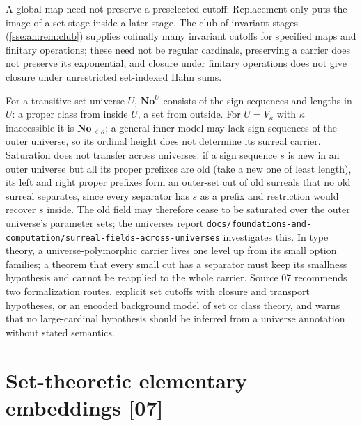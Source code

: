 \documentclass[11pt,a4paper]{article}
\numberwithin{equation}{section}
\theoremstyle{plain}
\theoremstyle{definition}
\theoremstyle{remark}
\newcommand{\No}{\mathbf{No}}
\newcommand{\fn}[1]{\nolinkurl{#1}}%
\newcommand{\src}[1]{\textup{\textsf{\small[#1]}}}%
\begin{document}
A global map need not preserve a preselected cutoff; Replacement only puts
the image of a set stage inside a later stage. The club of invariant stages
(\cref{sse:an:rem:club}) supplies cofinally many invariant cutoffs for
specified maps and finitary operations; these need not be regular cardinals,
preserving a carrier does not preserve its exponential, and closure under
finitary operations does not give closure under unrestricted set-indexed
Hahn sums.

For a transitive set universe $U$, $\No^U$ consists of the sign sequences and
lengths in $U$: a proper class from inside $U$, a set from outside. For
$U=V_\kappa$ with $\kappa$ inaccessible it is $\No_{<\kappa}$; a general inner
model may lack sign sequences of the outer universe, so its ordinal height
does not determine its surreal carrier. Saturation does not transfer across
universes: if a sign sequence $s$ is new in an outer universe but all its
proper prefixes are old (take a new one of least length), its left and right
proper prefixes form an outer-set cut of old surreals that no old surreal
separates, since every separator has $s$ as a prefix and restriction would
recover $s$ inside. The old field may therefore cease to be saturated over the
outer universe's parameter sets; the universes report
\fn{docs/foundations-and-computation/surreal-fields-across-universes}
investigates this. In type theory, a universe-polymorphic carrier lives one
level up from its small option families; a theorem that every small cut has a
separator must keep its smallness hypothesis and cannot be reapplied to the
whole carrier. Source 07 recommends two formalization routes, explicit set
cutoffs with closure and transport hypotheses, or an encoded background model
of set or class theory, and warns that no large-cardinal hypothesis should be
inferred from a universe annotation without stated semantics.

\section{Set-theoretic elementary embeddings \src{07}}\label{sse:an:fnd:sec:large}
\end{document}
